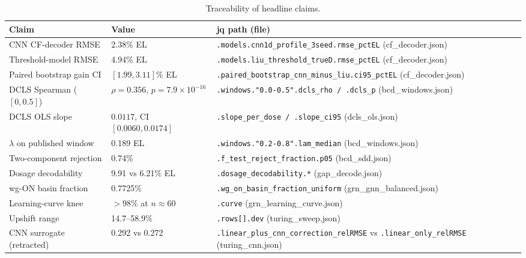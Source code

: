 \begin{table}[!htbp]
\centering
\caption{Traceability of headline claims.}
\small
\begin{tabular}{p{5.6cm}p{4.2cm}p{4.6cm}}
\toprule
Claim & Value & jq path (file) \\
\midrule
CNN CF-decoder RMSE & 2.38\% EL &
\texttt{.models.cnn1d\_profile\_3seed.rmse\_pctEL} (cf\_decoder.json) \\
Threshold-model RMSE & 4.94\% EL &
\texttt{.models.liu\_threshold\_trueD.rmse\_pctEL} (cf\_decoder.json) \\
Paired bootstrap gain CI & $[1.99, 3.11]\%$ EL &
\texttt{.paired\_bootstrap\_cnn\_minus\_liu.ci95\_pctEL} (cf\_decoder.json) \\
DCLS Spearman ($[0,0.5]$) & $\rho=0.356$, $p=7.9{\times}10^{-16}$ &
\texttt{.windows."0.0-0.5".dcls\_rho / .dcls\_p} (bcd\_windows.json) \\
DCLS OLS slope & $0.0117$, CI $[0.0060, 0.0174]$ &
\texttt{.slope\_per\_dose / .slope\_ci95} (dcls\_ols.json) \\
$\lambda$ on published window & 0.189 EL &
\texttt{.windows."0.2-0.8".lam\_median} (bcd\_windows.json) \\
Two-component rejection & 0.74\% &
\texttt{.f\_test\_reject\_fraction.p05} (bcd\_sdd.json) \\
Dosage decodability & 9.91 vs 6.21\% EL &
\texttt{.dosage\_decodability.*} (gap\_decode.json) \\
wg-ON basin fraction & 0.7725\% &
\texttt{.wg\_on\_basin\_fraction\_uniform} (grn\_gnn\_balanced.json) \\
Learning-curve knee & $>98\%$ at $n \approx 60$ &
\texttt{.curve} (grn\_learning\_curve.json) \\
Upshift range & 14.7--58.9\% &
\texttt{.rows[].dev} (turing\_sweep.json) \\
CNN surrogate (retracted) & 0.292 vs 0.272 &
\texttt{.linear\_plus\_cnn\_correction\_relRMSE} vs
\texttt{.linear\_only\_relRMSE} (turing\_cnn.json) \\
\bottomrule
\end{tabular}
\end{table}
